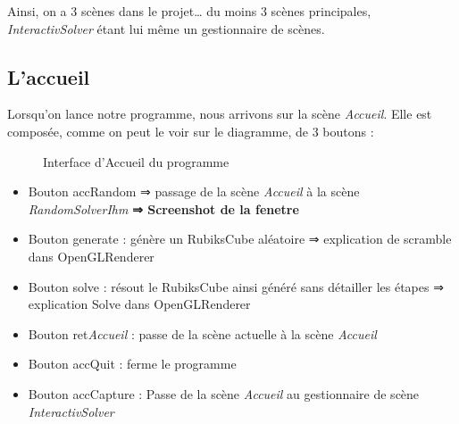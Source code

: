 Ainsi, on a 3 scènes dans le projet… du moins 3 scènes principales, \textit{InteractivSolver} étant lui même un gestionnaire de scènes.

\subsection{L'accueil}
Lorsqu’on lance notre programme, nous arrivons sur la scène \textit{Accueil}. Elle est composée, comme on peut le voir sur le diagramme, de 3 boutons :

\begin{figure}[h]
\begin{center}
\end{center}
	\caption{Interface d'Accueil du programme}
\end{figure}

\begin{itemize}
    \item Bouton accRandom 
    ⇒ passage de la scène \textit{Accueil} à la scène \textit{RandomSolverIhm}
    \textbf{⇒ Screenshot de la fenetre}

    \item Bouton generate : génère un RubiksCube aléatoire
        ⇒ explication de scramble dans OpenGLRenderer

    \item Bouton solve : résout le RubiksCube ainsi généré sans détailler les étapes
        ⇒ explication Solve dans OpenGLRenderer

    \item Bouton ret\textit{Accueil} : passe de la scène actuelle à la scène \textit{Accueil}

    \item Bouton accQuit : ferme le programme

    \item Bouton accCapture : Passe de la scène \textit{Accueil} au gestionnaire de scène \textit{InteractivSolver}

\end{itemize}

